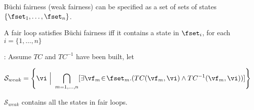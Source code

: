 
\vfill
B\"{u}chi fairness (weak fairness) can be specified as a set of sets of states $\{\fset_1, \ldots, \fset_n\}$.

A fair loop satisfies B\"{u}chi fairness iff it contains a state in $\fset_i$,
for each $i=\{1,\ldots,n\}$

: 
Assume $TC$ and $TC^{-1}$ have been built, let 

\begin{displaymath}
\mathcal{S}_{weak} = \left\{ \vi ~ \Big | ~ \bigcap_{m=1,\ldots,n}
[
\exists \vf_{m} \!\in\! \fset_m. (TC(\vf_{m}, \vi) \land TC^{-1}(\vf_{m}, \vi))
] \right\}
\end{displaymath}

$\mathcal{S}_{weak}$ contains all the states in fair loops. 
\vfill
